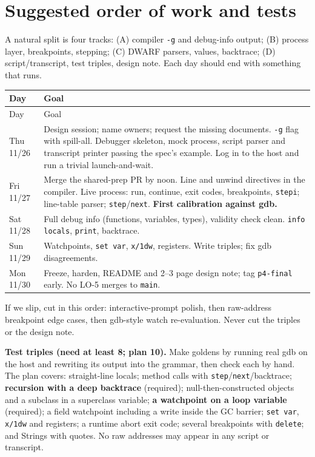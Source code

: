 \documentclass[10pt]{article}
\newcommand{\code}[1]{\texttt{\small #1}}
\begin{document}
\section{Suggested order of work and tests}\label{sec:plan}

A natural split is four tracks: (A) compiler \code{-g} and debug-info output; (B) process layer, breakpoints, stepping; (C) DWARF parsers, values, backtrace; (D) script/transcript, test triples, design note. Each day should end with something that runs.

\begin{xltabular}{\linewidth}{@{}L{1.9cm}Y@{}}
\toprule
Day & Goal \\
\midrule
\endfirsthead
\toprule Day & Goal \\ \midrule
\endhead
Thu 11/26 & Design session; name owners; request the missing documents. \code{-g} flag with spill-all. Debugger skeleton, mock process, script parser and transcript printer passing the spec's example. Log in to the host and run a trivial launch-and-wait. \\
Fri 11/27 & Merge the shared-prep PR by noon. Line and unwind directives in the compiler. Live process: run, continue, exit codes, breakpoints, \code{stepi}; line-table parser; \code{step}/\code{next}. \textbf{First calibration against gdb.} \\
Sat 11/28 & Full debug info (functions, variables, types), validity check clean. \code{info locals}, \code{print}, backtrace. \\
Sun 11/29 & Watchpoints, \code{set var}, \code{x/1dw}, registers. Write triples; fix gdb disagreements. \\
Mon 11/30 & Freeze, harden, README and 2--3 page design note; tag \code{p4-final} early. No LO-5 merges to \code{main}. \\
\bottomrule
\end{xltabular}
If we slip, cut in this order: interactive-prompt polish, then raw-address breakpoint edge cases, then gdb-style watch re-evaluation. Never cut the triples or the design note.

\textbf{Test triples (need at least 8; plan 10).} Make goldens by running real gdb on the host and rewriting its output into the grammar, then check each by hand. The plan covers: straight-line locals; method calls with \code{step}/\code{next}/backtrace; \textbf{recursion with a deep backtrace} (required); null-then-constructed objects and a subclass in a superclass variable; \textbf{a watchpoint on a loop variable} (required); a field watchpoint including a write inside the GC barrier; \code{set var}, \code{x/1dw} and registers; a runtime abort exit code; several breakpoints with \code{delete}; and Strings with quotes. No raw addresses may appear in any script or transcript.
\end{document}

